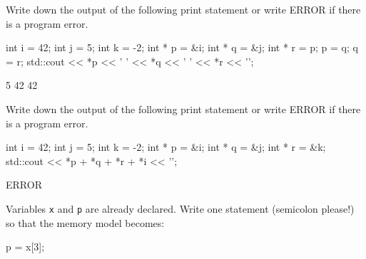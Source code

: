 

\nextq
Write down the output of the following print statement
or write ERROR if there is a program error.
\begin{console}
int i = 42;
int j = 5;
int k = -2;
int * p = &i;
int * q = &j;
int * r = p;
p = q;
q = r;
std::cout << *p << ' ' << *q << ' ' << *r << '\n';
\end{console}
\ANSWER
\begin{answercode}
5 42 42
\end{answercode}

\nextq
Write down the output of the following print statement
or write ERROR if there is a program error.
\begin{console}
int i = 42;
int j = 5;
int k = -2;
int * p = &i;
int * q = &j;
int * r = &k;
std::cout << *p + *q + *r + *i << '\n';
\end{console}
\ANSWER
\begin{answercode}
ERROR
\end{answercode}

\nextq
Variables \verb!x! and \verb!p! are already declared.
Write one statement (semicolon please!) so that the memory model becomes:
\ANSWER
\begin{answercode}
p = x[3];
\end{answercode}

